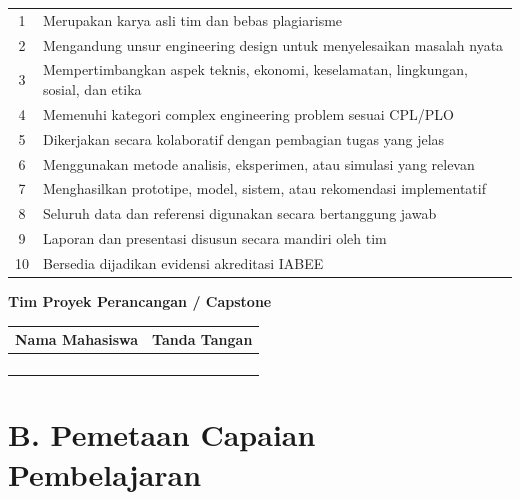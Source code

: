 \begin{longtable}{cp{13cm}}
1 & Merupakan karya asli tim dan bebas plagiarisme \\[0.2cm]
2 & Mengandung unsur engineering design untuk menyelesaikan masalah nyata \\[0.2cm]
3 & Mempertimbangkan aspek teknis, ekonomi, keselamatan, lingkungan, sosial, dan etika \\[0.2cm]
4 & Memenuhi kategori complex engineering problem sesuai CPL/PLO \\[0.2cm]
5 & Dikerjakan secara kolaboratif dengan pembagian tugas yang jelas \\[0.2cm]
6 & Menggunakan metode analisis, eksperimen, atau simulasi yang relevan \\[0.2cm]
7 & Menghasilkan prototipe, model, sistem, atau rekomendasi implementatif \\[0.2cm]
8 & Seluruh data dan referensi digunakan secara bertanggung jawab \\[0.2cm]
9 & Laporan dan presentasi disusun secara mandiri oleh tim \\[0.2cm]
10 & Bersedia dijadikan evidensi akreditasi IABEE \\

\end{longtable}

\vspace{0.3cm}

\textbf{Tim Proyek Perancangan / Capstone}

\begin{longtable}{|p{7cm}|p{7cm}|}
\hline
\centering
\textbf{Nama Mahasiswa} & 
\centering
\textbf{Tanda Tangan} \\ 
\hline
& \\[0.5cm] \hline
& \\[0.5cm] \hline
& \\[0.5cm] \hline
& \\[0.5cm] \hline
\end{longtable}
\vspace{0.1cm}
\section*{B. Pemetaan Capaian Pembelajaran}

